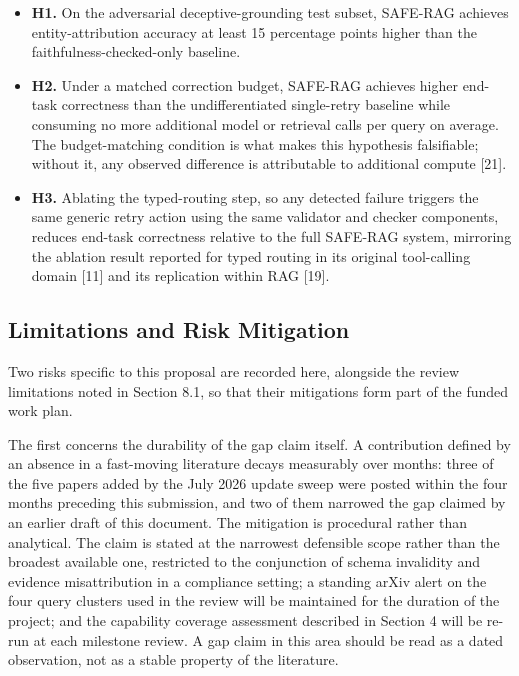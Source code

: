 \documentclass[11pt,a4paper]{article}
\begin{document}
\begin{itemize}
\item \textbf{H1.} On the adversarial deceptive-grounding test subset, SAFE-RAG achieves
entity-attribution accuracy at least 15 percentage points higher than the
faithfulness-checked-only baseline.

\item \textbf{H2.} Under a matched correction budget, SAFE-RAG achieves higher end-task
correctness than the undifferentiated single-retry baseline while consuming no more
additional model or retrieval calls per query on average. The budget-matching condition is
what makes this hypothesis falsifiable; without it, any observed difference is
attributable to additional compute [21].

\item \textbf{H3.} Ablating the typed-routing step, so any detected failure triggers the
same generic retry action using the same validator and checker components, reduces
end-task correctness relative to the full SAFE-RAG system, mirroring the ablation result
reported for typed routing in its original tool-calling domain [11] and its replication
within RAG [19].
\end{itemize}

\subsection{Limitations and Risk Mitigation}

Two risks specific to this proposal are recorded here, alongside the review limitations
noted in Section 8.1, so that their mitigations form part of the funded work plan.

The first concerns the durability of the gap claim itself. A contribution defined by an
absence in a fast-moving literature decays measurably over months: three of the five
papers added by the July 2026 update sweep were posted within the four months preceding
this submission, and two of them narrowed the gap claimed by an earlier draft of this
document. The mitigation is procedural rather than analytical. The claim is stated at the
narrowest defensible scope rather than the broadest available one, restricted to the
conjunction of schema invalidity and evidence misattribution in a compliance setting; a
standing arXiv alert on the four query clusters used in the review will be maintained for
the duration of the project; and the capability coverage assessment described in Section 4
will be re-run at each milestone review. A gap claim in this area should be read as a
dated observation, not as a stable property of the literature.
\end{document}
